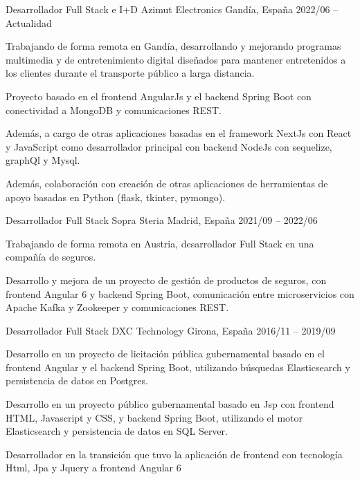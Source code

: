 \documentclass[]{awesome-cv}
\begin{document}
\begin{cventries}
	\cventry
	{Desarrollador Full Stack e I+D}
	{Azimut Electronics}
	{Gandía, España}
	{2022/06 – Actualidad}
	{\begin{cvitems}
		\vspace{0.5mm}
		\item {Trabajando de forma remota en Gandía, desarrollando y mejorando programas multimedia y de entretenimiento digital diseñados para mantener entretenidos a los clientes durante el transporte público a larga distancia.}
		\item {Proyecto basado en el frontend AngularJs y el backend Spring Boot con conectividad a MongoDB y comunicaciones REST.}
        \item {Además, a cargo de otras aplicaciones basadas en el framework NextJs con React y JavaScript como desarrollador principal con backend NodeJs con sequelize, graphQl y Mysql.}
        \item {Además, colaboración con creación de otras aplicaciones de herramientas de apoyo basadas en Python (flask, tkinter, pymongo).}
		\end{cvitems}}

	\cventry
	{Desarrollador Full Stack}
	{Sopra Steria}
	{Madrid, España}
	{2021/09 – 2022/06}
	{\begin{cvitems}
		\vspace{0.5mm}
		\item {Trabajando de forma remota en Austria, desarrollador Full Stack en una compañía de seguros.}
		\item {Desarrollo y mejora de un proyecto de gestión de productos de seguros, con frontend Angular 6 y backend Spring Boot, comunicación entre microservicios con Apache Kafka y Zookeeper y comunicaciones REST.}
		\end{cvitems}}

	\cventry
	{Desarrollador Full Stack}
	{DXC Technology}
	{Girona, España}
	{2016/11 – 2019/09}
	{\begin{cvitems}
		\vspace{0.5mm}
		\item {Desarrollo en un proyecto de licitación pública gubernamental basado en el frontend Angular y el backend Spring Boot, utilizando búsquedas Elasticsearch y persistencia de datos en Postgres.}
  \item {Desarrollo en un proyecto público gubernamental basado en Jsp con frontend HTML, Javascript y CSS, y backend Spring Boot, utilizando el motor Elasticsearch y persistencia de datos en SQL Server.}
  \item {Desarrollador en la transición que tuvo la aplicación de frontend con tecnología Html, Jpa y Jquery a frontend Angular 6}
		\end{cvitems}}


\end{cventries}
\end{document}
